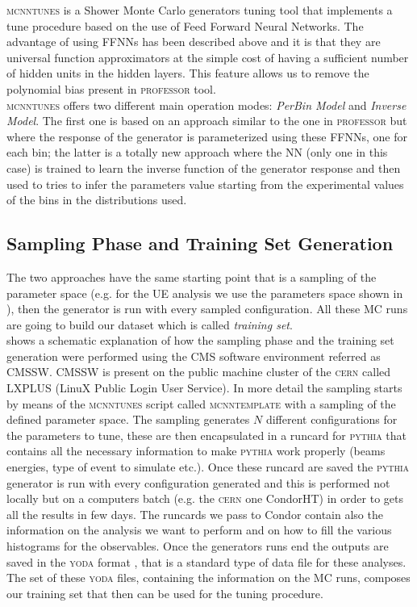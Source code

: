 \textsc{mcnntunes} \cite{MCNNTUNESarticle} is a Shower Monte Carlo generators tuning tool that implements a tune procedure based on the use of Feed Forward Neural Networks. The advantage of using FFNNs has been described above and it is that they are universal function approximators at the simple cost of having a sufficient number of hidden units in the hidden layers. This feature allows us to remove the polynomial bias present in \textsc{professor} tool.
\\
\textsc{mcnntunes} offers two different main operation modes: \textit{PerBin Model} and \textit{Inverse Model}. The first one is based on an approach similar to the one in \textsc{professor} but where the response of the generator is parameterized using these FFNNs, one for each bin; the latter is a totally new approach where the NN (only one in this case) is trained to learn the inverse function of the generator response and then used to tries to infer the parameters value starting from the experimental values of the bins in the distributions used.
\\

\medskip

\subsection{Sampling Phase and Training Set Generation}

The two approaches have the same starting point that is a sampling of the parameter space (e.g. for the UE analysis we use the parameters space shown in ), then the generator is run with every sampled configuration. 
All these MC runs are going to build our dataset which is called \textit{training set}.
\\
 shows a schematic explanation of how the sampling phase and the training set generation were performed using the CMS software environment referred as CMSSW. CMSSW is present on the public machine cluster of the \textsc{cern} called LXPLUS (LinuX Public Login User Service). 
In more detail the sampling starts by means of the  \textsc{mcnntunes} script called \textsc{mcnntemplate} with a sampling of the defined parameter space. The sampling generates  $N$ different configurations for the parameters to tune, these are then encapsulated in a runcard for \textsc{pythia} that contains all the necessary information to make \textsc{pythia} work properly (beams energies, type of event to simulate etc.). Once these runcard are saved the \textsc{pythia} generator is run with every configuration generated and this is performed not locally but on a computers batch (e.g. the \textsc{cern} one CondorHT) in order to gets all the results in few days. The runcards we pass to Condor contain also the information on the analysis we want to perform and on how to fill the various histograms for the observables. Once the generators runs end the outputs are saved in the \textsc{yoda} format \cite{YODA}, that is a standard type of data file for these analyses. The set of these \textsc{yoda} files, containing the information on the MC runs, composes our training set that then can be used for the tuning procedure.

